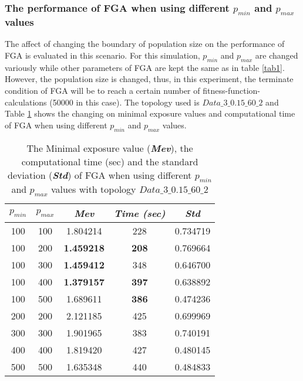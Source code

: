 \documentclass[final]{elsarticle}
\begin{document}
\subsubsection{The performance of FGA when using different $ p_{min} $ and $ p_{max} $ values}
The affect of changing the boundary of population size on the performance of FGA is evaluated in this scenario. For this simulation, $ p_{min} $ and $ p_{max} $ are changed variously while other parameters of FGA are kept the same as in table \ref{tab1}. However, the population size is changed, thus, in this experiment, the terminate condition of FGA will be to reach a certain number of fitness-function-calculations (50000 in this case). The topology used is $ Data\_3\_0.15\_60\_2 $ and Table \ref{tab2} shows the changing on minimal exposure values and computational time of FGA when using different $ p_{min} $ and $ p_{max} $ values.
\begin{table}
	\caption{The Minimal exposure value (\textbf{\textit{Mev}}), the computational time (sec) and the standard deviation (\textbf{\textit{Std}}) of FGA when using different $ p_{min} $ and $ p_{max} $ values with topology $ Data\_3\_0.15\_60\_2 $  }
	\label{tab2}       %
	\begin{center}
		\renewcommand{\arraystretch}{1.5}
		\begin{tabular}{|c|c|c|c|c|}
			\hline
			\textbf{$p_{min}$} & \textbf{$p_{max}$ } & \textit{\textbf{Mev}} &\textit{ \textbf{Time (sec)}} & \textit{\textbf{Std}} \\
			\hline
			100 & 100 &1.804214 &228 &0.734719\\
			\hline
			100 & 200 &\textbf{1.459218} &\textbf{208} &0.769664\\
			\hline
			100 & 300 &\textbf{1.459412} &348 &0.646700\\
			\hline
			100 & 400 &\textbf{1.379157} &\textbf{397} &0.638892\\
			\hline
			100 & 500 &1.689611 &\textbf{386} &0.474236\\
			\hline\hline
			200 & 200 &2.121185 &425 &0.699969\\\hline
			300 & 300 &1.901965 &383 &0.740191\\\hline
			400 & 400 &1.819420 &427 &0.480145\\\hline
			500 & 500 &1.635348 &440 &0.484833\\\hline
		\end{tabular}
	\end{center}
\end{table}
\end{document}
